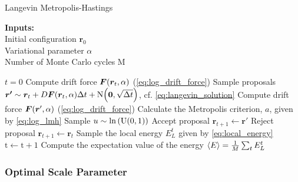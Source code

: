 \begin{algorithm}
\caption{Langevin Metropolis-Hastings}\label{algo:lmh}
\hspace*{\algorithmicindent} \textbf{Inputs:} \\
\hspace*{\algorithmicindent} Initial configuration $\bm{r}_0$ \\
\hspace*{\algorithmicindent} Variational parameter $\alpha$ \\
\hspace*{\algorithmicindent} Number of Monte Carlo cycles $\mathrm{M}$
\begin{algorithmic}[1]
\State $t=0$
\Repeat 
    \State Compute drift force $\bm{F} \qty(\bm{r}_t, \alpha)$ (\autoref{eq:log_drift_force})
    \State Sample proposals $\bm{r'} \sim \bm{r}_t + D \bm{F} \qty(\bm{r}_t, \alpha) \Delta t + \mathrm{N}\qty(\bm{0}, \sqrt{\Delta t})$, cf. \autoref{eq:langevin_solution}
    \State Compute drift force $\bm{F} \qty(\bm{r}', \alpha)$ (\autoref{eq:log_drift_force})
    \State Calculate the Metropolis criterion, $a$, given by \autoref{eq:log_lmh} 
    \State Sample $u \sim \ln{\qty(\mathrm{U}(0, 1))}$
        \State Accept proposal $\bm{r}_{t+1} \gets \bm{r'}$
    \Else
        \State Reject proposal $\bm{r}_{t+1} \gets\bm{r}_t$
    \EndIf
    \State Sample the local energy $E_L^t$ given by \autoref{eq:local_energy}
    \State $\mathrm{t}\gets\mathrm{t}+1$
    \State Compute the expectation value of the energy $\expval{E} = \frac{1}{M} \sum_t E_L^t$
\end{algorithmic}
\end{algorithm}


\subsubsection{Optimal Scale Parameter}\label{sec:tuning}

